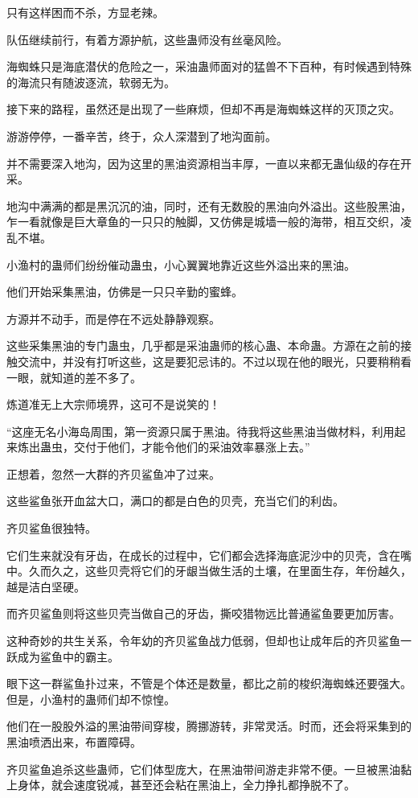 \begin{this_body}
只有这样困而不杀，方显老辣。

队伍继续前行，有着方源护航，这些蛊师没有丝毫风险。

海蜘蛛只是海底潜伏的危险之一，采油蛊师面对的猛兽不下百种，有时候遇到特殊的海流只有随波逐流，软弱无为。

接下来的路程，虽然还是出现了一些麻烦，但却不再是海蜘蛛这样的灭顶之灾。

游游停停，一番辛苦，终于，众人深潜到了地沟面前。

并不需要深入地沟，因为这里的黑油资源相当丰厚，一直以来都无蛊仙级的存在开采。

地沟中满满的都是黑沉沉的油，同时，还有无数股的黑油向外溢出。这些股黑油，乍一看就像是巨大章鱼的一只只的触脚，又仿佛是城墙一般的海带，相互交织，凌乱不堪。

小渔村的蛊师们纷纷催动蛊虫，小心翼翼地靠近这些外溢出来的黑油。

他们开始采集黑油，仿佛是一只只辛勤的蜜蜂。

方源并不动手，而是停在不远处静静观察。

这些采集黑油的专门蛊虫，几乎都是采油蛊师的核心蛊、本命蛊。方源在之前的接触交流中，并没有打听这些，这是要犯忌讳的。不过以现在他的眼光，只要稍稍看一眼，就知道的差不多了。

炼道准无上大宗师境界，这可不是说笑的！

“这座无名小海岛周围，第一资源只属于黑油。待我将这些黑油当做材料，利用起来炼出蛊虫，交付于他们，才能令他们的采油效率暴涨上去。”

正想着，忽然一大群的齐贝鲨鱼冲了过来。

这些鲨鱼张开血盆大口，满口的都是白色的贝壳，充当它们的利齿。

齐贝鲨鱼很独特。

它们生来就没有牙齿，在成长的过程中，它们都会选择海底泥沙中的贝壳，含在嘴中。久而久之，这些贝壳将它们的牙龈当做生活的土壤，在里面生存，年份越久，越是洁白坚硬。

而齐贝鲨鱼则将这些贝壳当做自己的牙齿，撕咬猎物远比普通鲨鱼要更加厉害。

这种奇妙的共生关系，令年幼的齐贝鲨鱼战力低弱，但却也让成年后的齐贝鲨鱼一跃成为鲨鱼中的霸主。

眼下这一群鲨鱼扑过来，不管是个体还是数量，都比之前的梭织海蜘蛛还要强大。但是，小渔村的蛊师们却不惊惶。

他们在一股股外溢的黑油带间穿梭，腾挪游转，非常灵活。时而，还会将采集到的黑油喷洒出来，布置障碍。

齐贝鲨鱼追杀这些蛊师，它们体型庞大，在黑油带间游走非常不便。一旦被黑油黏上身体，就会速度锐减，甚至还会粘在黑油上，全力挣扎都挣脱不了。


\end{this_body}
